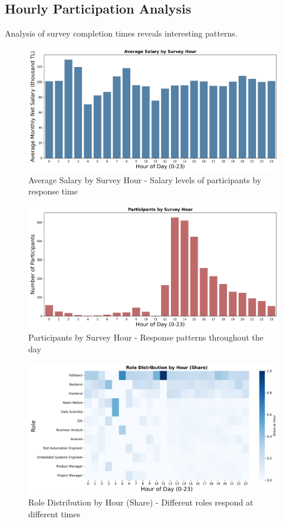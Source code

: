 \documentclass[12pt,a4paper]{article}
\begin{document}
\subsection{Hourly Participation Analysis}
Analysis of survey completion times reveals interesting patterns.

\begin{figure}[H]
    \centering
    \includegraphics[width=\textwidth]{figures/barplot_hourly_avg_salary.png}
    \caption{Average Salary by Survey Hour - Salary levels of participants by response time}
\end{figure}

\begin{figure}[H]
    \centering
    \includegraphics[width=\textwidth]{figures/barplot_hourly_participants.png}
    \caption{Participants by Survey Hour - Response patterns throughout the day}
\end{figure}

\begin{figure}[H]
    \centering
    \includegraphics[width=\textwidth]{figures/heatmap_roles_by_hour.png}
    \caption{Role Distribution by Hour (Share) - Different roles respond at different times}
\end{figure}
\end{document}
